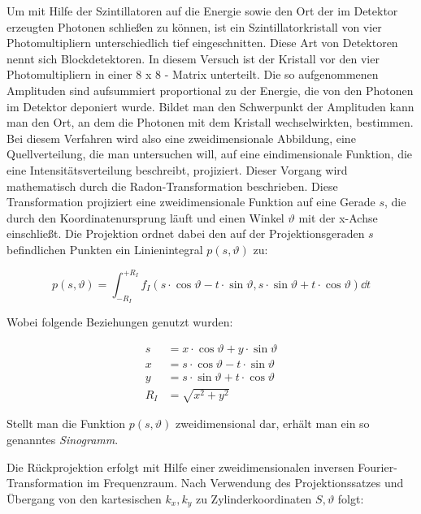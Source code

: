 \documentclass[slug=PET, room=Andreas-Schubert-Bau\,\ 424A, supervisor=Carsten\ Bittrich, coursedate=10.\ 01.\ 2020]{../../Lab_Report_LaTeX/lab_report}
\begin{document}
Um mit Hilfe der Szintillatoren auf die Energie sowie den Ort der im Detektor erzeugten Photonen
schließen zu können, ist ein Szintillatorkristall von vier Photomultipliern unterschiedlich tief
eingeschnitten. Diese Art von Detektoren nennt sich Blockdetektoren. In diesem Versuch ist der
Kristall vor den vier Photomultipliern in einer 8 x 8 - Matrix unterteilt.
Die so aufgenommenen Amplituden sind aufsummiert proportional zu der Energie, die von den
Photonen im Detektor deponiert wurde. Bildet man den Schwerpunkt der Amplituden kann man
den Ort, an dem die Photonen mit dem Kristall wechselwirkten, bestimmen.\\

Bei diesem Verfahren wird also eine zweidimensionale Abbildung, eine Quellverteilung, die man
untersuchen will, auf eine eindimensionale Funktion, die eine Intensitätsverteilung beschreibt,
projiziert.
Dieser Vorgang wird mathematisch durch die Radon-Transformation beschrieben. Diese Transformation
projiziert eine zweidimensionale Funktion auf eine Gerade \(s\), die durch den Koordinatenursprung
läuft und einen Winkel \(\vartheta\) mit der x-Achse einschließt.
Die Projektion ordnet dabei den auf der Projektionsgeraden \(s\) befindlichen Punkten ein
Linienintegral \(p(s, \vartheta)\) zu:

\begin{equation}\label{eq:linienint}
        p(s, \vartheta) = \int_{-R_I}^{+R_I} f_I(s \cdot \cos
        \vartheta - t \cdot \sin \vartheta, s \cdot \sin\vartheta + t
        \cdot \cos\vartheta) \dd{t}
\end{equation}

Wobei folgende Beziehungen genutzt wurden:

\begin{align}
        s &= x \cdot \cos\vartheta + y \cdot \sin\vartheta \\
        x &= s \cdot \cos \vartheta - t \cdot \sin \vartheta \\
        y &= s \cdot \sin\vartheta + t \cdot \cos\vartheta \\
        R_I &= \sqrt{x^2 + y^2}
\end{align}

Stellt man die Funktion \(p(s, \vartheta)\) zweidimensional dar, erhält man ein so genanntes
\emph{Sinogramm}.

Die Rückprojektion erfolgt mit Hilfe einer zweidimensionalen inversen Fourier-Transformation im
Frequenzraum. Nach Verwendung des Projektionssatzes und Übergang von den kartesischen \(k_x, k_y\)
zu Zylinderkoordinaten \(S, \vartheta\) folgt:
\end{document}

